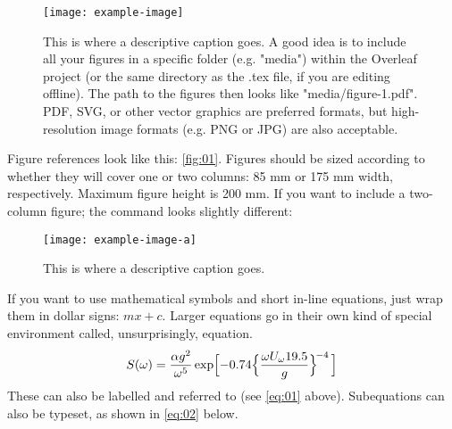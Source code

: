 \documentclass[draft, {\secondLanguage}, english]{VolcanicaStyle-production}
\begin{document}
\begin{figure}[!b]								%
\centering
\texttt{[image: example-image]} %
\caption{This is where a descriptive caption goes. A good idea is to include all your figures in a specific folder (e.g. "media") within the Overleaf project (or the same directory as the .tex file, if you are editing offline). The path to the figures then looks like "media/figure-1.pdf". PDF, SVG, or other vector graphics are preferred formats, but high-resolution image formats (e.g. PNG or JPG) are also acceptable.}		%
\label{fig:01}			%
\end{figure}

Figure references look like this: \autoref{fig:01}. Figures should be sized according to whether they will cover one or two columns: 85 mm or 175 mm width, respectively. Maximum figure height is 200 mm. If you want to include a two-column figure; the command looks slightly different:
\begin{figure*}[!t]								%
\centering
\texttt{[image: example-image-a]} %
\caption{This is where a descriptive caption goes.}	%
\label{fig:02}									%
\end{figure*}

If you want to use mathematical symbols and short in-line equations, just wrap them in dollar signs: $mx +c$. Larger equations go in their own kind of special environment called, unsurprisingly, equation.
\begin{equation}
S(\omega) = \frac{\alpha g^2}{\omega^5} \exp\Bigl[ -0.74\Bigl\{\frac{\omega U_\omega 19.5}{g}\Bigr\}^{\!-4}\,\Bigr] 
\label{eq:01}\end{equation}
These can also be labelled and referred to (see \autoref{eq:01} above). Subequations can also be typeset, as shown in \autoref{eq:02} below.
\end{document}
